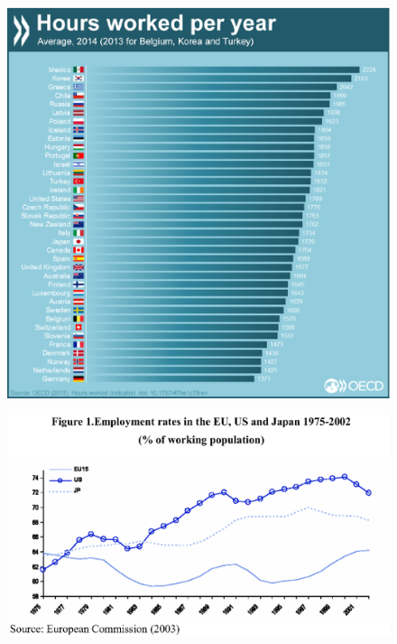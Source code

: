 \documentclass{beamer}
\begin{document}
\begin{frame}
  \begin{figure}
    \includegraphics[scale=.4]{hours_worked2.eps}
  \end{figure}
\end{frame}

\begin{frame}
  \begin{figure}
    \includegraphics[scale=.7]{employment_rate.eps}
  \end{figure}
\end{frame}
\end{document}
